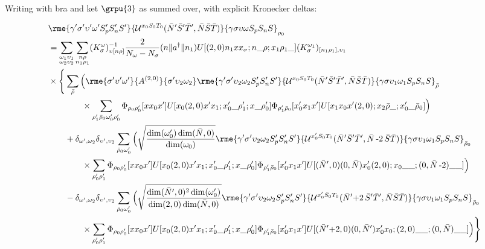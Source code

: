 \documentclass[%
  aps,%
  prc,%
  showpacs,%
  superscriptaddress,%
  onecolumn,%
  notitlepage,%
  11pt,%
  floatfix,%
  amsmath,%
  amssymb,%
]{revtex4-2}
\newcommand{\negative}{\,\text{-}}
\newcommand{\plus}{\text{+}}
\begin{document}
Writing with bra and ket $\grpu{3}$ as summed over, with explicit Kronecker deltas:

\begin{align*}
  &\rme{\gamma'\sigma'\upsilon'\omega'S_p'S_n'S'}{\mathcal{U}^{x_0 S_0 T_0}(\bar{N}'\bar{S}'\bar{T}',\bar{N}\bar{S}\bar{T})}{\gamma\sigma\upsilon\omega S_pS_nS}_{\rho_0}\\
  &=\sum_{\substack{\omega_1\upsilon_1\\\omega_2\upsilon_2}} \sum_{\substack{n\rho\\n_1\rho_1}}(K_\sigma^\omega)_{\upsilon[n\rho]}^{-1}\frac{2}{N_\omega - N_\sigma}(n\Vert{}a^\dagger\Vert{}n_1) U[(2,0)n_1 x x_\sigma;n\_\rho;x_1\rho_1\_](K_\sigma^{\omega_1})_{[n_1\rho_1],\upsilon_1}\\
  &\times\Bigg\{\sum_{\bar{\rho}}\Big(
      \rme{\sigma'\upsilon'\omega'}{A^{(2,0)}}{\sigma'\upsilon_2\omega_2}
      \rme{\gamma'\sigma'\upsilon_2\omega_2S_p'S_n'S'}{\mathcal{U}^{x_0S_0T_0}(\bar{N}'\bar{S}'\bar{T}',\bar{N}\bar{S}\bar{T})}{\gamma\sigma\upsilon_1\omega_1S_pS_nS}_{\bar{\rho}}\\
  &\qquad\qquad\times \sum_{\rho_1'\bar{\rho}_0\omega_0'\rho_0'}\Phi_{\rho_0\rho_0'}[x x_0 x'] U[x_0(2,0)x'x_1;x_0'\_\rho_1';x\_\rho_0']\Phi_{\rho_1'\bar{\rho}_0}[x_0' x_1 x'] U[x_1 x_0 x' (2,0);x_2\bar{\rho}\_;x_0'\_\bar{\rho}_0] \Big)\\
  &\qquad+
  \delta_{\omega',\omega_2}\delta_{\upsilon',\upsilon_2}
  \sum_{\bar{\rho}_0\omega_0'}\Big(\sqrt{\frac{\dim(\omega_0')\dim(\bar{N},0)}{\dim(\omega_0)}}
  \rme{\gamma'\sigma'\upsilon_2\omega_2 S_p'S_n'S'}{\mathcal{U}^{x_0'S_0T_0}(\bar{N}'\bar{S}'\bar{T}',\bar{N}\negative2\,\bar{S}\bar{T})}{\gamma\sigma\upsilon_1\omega_1S_pS_nS}_{\bar{\rho}_0}\\
  &\qquad\qquad\times \sum_{\rho_0'\rho_1'}\Phi_{\rho_0\rho_0'}[x x_0 x'] U[x_0 (2,0)x' x_1;x_0'\_\rho_1';x\_\rho_0']\Phi_{\rho_1'\bar{\rho}_0}[x_0' x_1 x'] U[(\bar{N}',0) (0,\bar{N}) x_0' (2,0);x_0\_\_;(0,\bar{N}\negative2)\_\_]\Big)\\
  &\qquad-
  \delta_{\omega',\omega_2}\delta_{\upsilon',\upsilon_2}
  \sum_{\bar{\rho}_0\omega_0'}\Big(\sqrt{\frac{\dim(\bar{N}',0)^2\dim(\omega_0')}{\dim(2,0)\dim(\bar{N},0)}}
  \rme{\gamma'\sigma'\upsilon_2\omega_2 S_p'S_n'S'}{\mathcal{U}^{x_0' S_0 T_0}(\bar{N}'\plus2\,\bar{S}'\bar{T}',\bar{N}\bar{S}\bar{T})}{\gamma\sigma\upsilon_1\omega_1S_pS_nS}_{\bar{\rho}_0}\\
  &\qquad\qquad\times \sum_{\rho_0'\rho_1'}\Phi_{\rho_0\rho_0'}[x x_0 x'] U[x_0 (2,0) x' x_1;x_0'\_\rho_1';x\_\rho_0']\Phi_{\rho_1'\bar{\rho}_0}[x_0' x_1 x'] U[(\bar{N}'\plus2,0)(0,\bar{N}') x_0' x_0;(2,0)\_\_;(0,\bar{N})\_\_] \Big)\Bigg\}
\end{align*}
\end{document}
